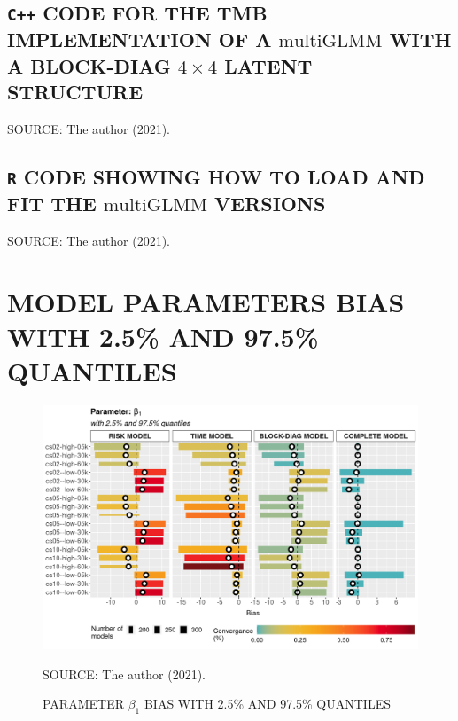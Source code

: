 \documentclass[12pt, %
               openright, %
               oneside, %
               a4paper, %
               chapter=TITLE, %
               section=TITLE, %
               brazil,
               english %
]{abntex2}
\begin{document}
\begin{apendicesenv}
\section{\texttt{C++} CODE FOR THE TMB IMPLEMENTATION OF A
         \(\text{multiGLMM}\) WITH A BLOCK-DIAG \(4\times4\) LATENT
         STRUCTURE}
\label{cap:blockdiagModel}


\vspace{-0.5cm}
\begin{center}
 \begin{footnotesize}
  SOURCE: The author (2021).
 \end{footnotesize}
\end{center}

\section{\texttt{R} CODE SHOWING HOW TO LOAD AND FIT THE
         \(\text{multiGLMM}\) VERSIONS}
\label{cap:rscript}


\vspace{-0.5cm}
\begin{center}
 \begin{footnotesize}
  SOURCE: The author (2021).
 \end{footnotesize}
\end{center}

\chapter{MODEL PARAMETERS BIAS WITH 2.5\% AND 97.5\% QUANTILES}
\label{cap:appendixE}
\vspace{-0.65cm}
\begin{figure}[H]
 \setlength{\abovecaptionskip}{.0001pt}
 \caption{PARAMETER \(\beta_{1}\) BIAS WITH 2.5\% AND 97.5\% QUANTILES}
 \vspace{0.2cm}\centering
 \includegraphics[width=\textwidth]{bias2plot-1.png}\\
 \begin{footnotesize}
  SOURCE: The author (2021).
 \end{footnotesize}
 \label{fig:biasbeta1}
\end{figure}


\end{apendicesenv}
\end{document}
